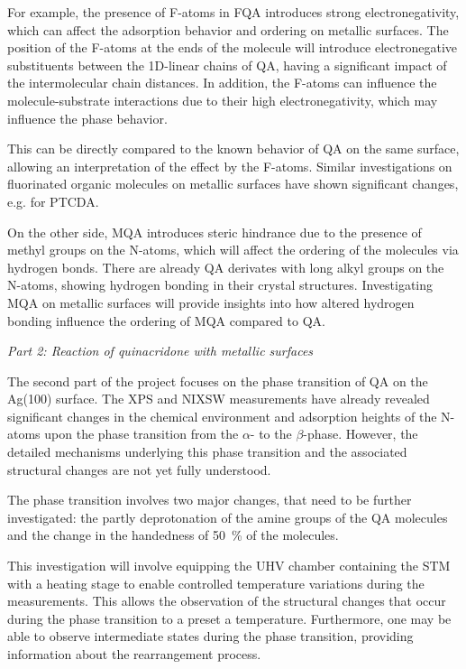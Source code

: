 \documentclass[11pt, a4paper]{scrreprt}
\begin{document}
For example, the presence of F-atoms in \ac{FQA} introduces strong electronegativity, which can affect the adsorption behavior and ordering on metallic surfaces. The position of the F-atoms at the ends of the molecule will introduce electronegative substituents between the 1D-linear chains of \ac{QA}, having a significant impact of the intermolecular chain distances. In addition, the F-atoms can influence the molecule-substrate interactions due to their high electronegativity, which may influence the phase behavior.

This can be directly compared to the known behavior of \ac{QA} on the same surface, allowing an interpretation of the effect by the F-atoms. Similar investigations on fluorinated organic molecules on metallic surfaces have shown significant changes, e.g. for \ac{PTCDA}.\autocite{Wang2020}

On the other side, \ac{MQA} introduces steric hindrance due to the presence of methyl groups on the N-atoms, which will affect the ordering of the molecules via hydrogen bonds. There are already \ac{QA} derivates with long alkyl groups on the N-atoms, showing hydrogen bonding in their crystal structures.\autocite{Zhao2009,Wang2007} Investigating \ac{MQA} on metallic surfaces will provide insights into how altered hydrogen bonding influence the ordering of \ac{MQA} compared to \ac{QA}.

\textit{Part 2: Reaction of quinacridone with metallic surfaces}

The second part of the project focuses on the phase transition of \ac{QA} on the Ag(100) surface. The \ac{XPS} and \ac{NIXSW} measurements have already revealed significant changes in the chemical environment and adsorption heights of the N-atoms upon the phase transition from the $\alpha$- to the $\beta$-phase. However, the detailed mechanisms underlying this phase transition and the associated structural changes are not yet fully understood. 

The phase transition involves two major changes, that need to be further investigated: the partly deprotonation of the amine groups of the \ac{QA} molecules and the change in the handedness of 50~\% of the molecules. 

This investigation will involve equipping the \ac{UHV} chamber containing the \ac{STM} with a heating stage to enable controlled temperature variations during the measurements. This allows the observation of the structural changes that occur during the phase transition to a preset a temperature. Furthermore, one may be able to observe intermediate states during the phase transition, providing information about the rearrangement process.
\end{document}
